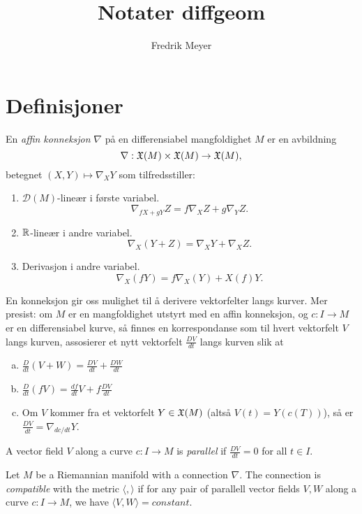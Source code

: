 \documentclass[11pt, norsk]{article}
\begin{document}
\title{Notater diffgeom}
\author{Fredrik Meyer}
\maketitle 


\section{Definisjoner}

\begin{defi}
En \emph{affin konneksjon} $\nabla$ på en differensiabel mangfoldighet $M$ er en avbildning
\[
\nabla: \mathfrak X(M) \times \mathfrak X(M) \to \mathfrak X(M),
\]
betegnet $(X,Y) \mapsto \nabla_X Y$ som tilfredsstiller:
\begin{enumerate}
\item $\mathscr D(M)$-lineær i første variabel. $$\nabla_{fX +gY}Z = f \nabla_X Z + g \nabla_Y Z.$$
\item $\mathbb{R}$-lineær i andre variabel. $$\nabla_X(Y+Z) = \nabla_X Y + \nabla_X Z.$$
\item Derivasjon i andre variabel. $$ \nabla_X(f Y) = f \nabla _X(Y) + X(f) Y.$$
\end{enumerate}
\end{defi}

En konneksjon gir oss mulighet til å derivere vektorfelter langs kurver. Mer presist: om $M$ er en mangfoldighet utstyrt med en affin konneksjon, og $c:I \to M$ er en differensiabel kurve, så finnes en korrespondanse som til hvert vektorfelt $V$ langs kurven, assosierer et nytt vektorfelt $\frac{DV}{dt}$ langs kurven slik at 
\begin{enumerate}[a)]
\item $\frac{D}{dt}(V+W) = \frac{DV}{dt} + \frac{DW}{dt}$
\item $\frac{D}{dt}(fV) = \frac{df}{dt} V + f \frac{DV}{dt}$ \\
\item Om $V$ kommer fra et vektorfelt $Y \in \mathfrak X(M)$ (altså $V(t) = Y(c(T))$), så er $\frac{DV}{dt} = \nabla_{dc/dt} Y$.
\end{enumerate}

\begin{defi}
A vector field $V$ along a curve $c:I \to M$ is \emph{parallel} if $\frac{DV}{dt}=0$ for all $ t \in I$.
\end{defi}


\begin{defi}
 Let $M$ be a Riemannian manifold with a connection $\nabla$. The connection is \emph{compatible} with the metric $\langle , \rangle$ if for any pair of parallell vector fields $V,W$  along a curve $c:I \to M$, we have $\langle V,W \rangle = constant$. 
\end{defi}
 
\end{document}
